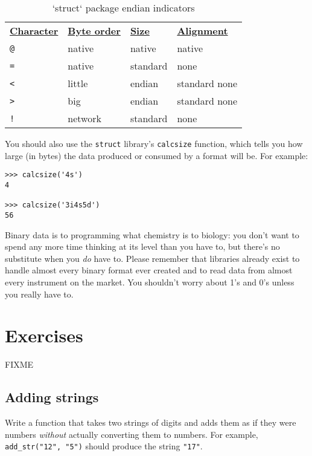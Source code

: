 \documentclass{scrbook}
\begin{document}
\begin{table}
\begin{tabular}{llll}
\textbf{\underline{Character}} & \textbf{\underline{Byte order}} & \textbf{\underline{Size}} & \textbf{\underline{Alignment}} \\
\texttt{@} & native & native & native \\
\texttt{=} & native & standard & none \\
\texttt{<} & little & endian & standard none \\
\texttt{>} & big & endian & standard none \\
\texttt{!} & network & standard & none \\
\end{tabular}
\caption{`struct` package endian indicators}
\label{binary-endian}
\end{table}



You should also use the \texttt{struct} library's \texttt{calcsize} function,
which tells you how large (in bytes) the data produced or consumed by a format will be.
For example:

\begin{lstlisting}[frame=single,frameround=tttt]
>>> calcsize('4s')
4

>>> calcsize('3i4s5d')
56
\end{lstlisting}


Binary data is to programming what chemistry is to biology:
you don't want to spend any more time thinking at its level than you have to,
but there's no substitute when you \emph{do} have to.
Please remember that libraries already exist to handle almost every binary format ever created
and to read data from almost every instrument on the market.
You shouldn't worry about 1's and 0's unless you really have to.

\section{Exercises}\label{binary-exercises}


FIXME

\subsection*{Adding strings}


Write a function that takes two strings of digits
and adds them as if they were numbers
\emph{without} actually converting them to numbers.
For example,
\texttt{add\_str("12", "5")} should produce the string \texttt{"17"}.
\end{document}
